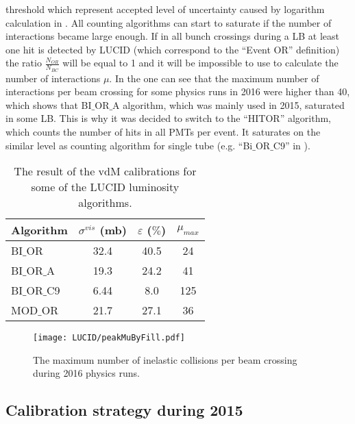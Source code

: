 threshold which represent accepted level of uncertainty caused by logarithm calculation in .
All counting algorithms can start to saturate if the number of interactions became large enough.
If in all bunch crossings during a LB at least one hit is detected by LUCID (which correspond to the ``Event OR'' definition) 
the ratio $\frac{N_{OR}}{N_{BC}}$ will be equal to 1 and it will be impossible to use  to calculate 
the number of interactions $\mu$. In the  one can see that the maximum number of interactions per beam crossing 
for some physics runs in 2016 were higher than 40, which shows that BI$\_$OR$\_$A algorithm, which was mainly used in 2015, saturated in some LB.
This is why it was decided to switch to the ``HITOR'' algorithm, which counts the number of hits in all PMTs per event.
It saturates on the similar level as counting algorithm for single tube (e.g. ``Bi$\_$OR$\_$C9'' in ).

\begin{table}[p]
  \begin{tabular}{|l|c|c|c|}
    Algorithm & $\sigma^{vis}$ (mb) & $\varepsilon$ ($\%$) & $\mu_{max}$ \\
    \hline
    BI$\_$OR & 32.4 & 40.5 & 24 \\
    \hline
    BI$\_$OR$\_$A & 19.3 & 24.2 & 41 \\
    \hline
    BI$\_$OR$\_$C9 & 6.44 & 8.0 & 125 \\
    \hline
    MOD$\_$OR & 21.7 & 27.1 & 36 \\
  \end{tabular}
  \caption{The result of the vdM calibrations for some of the LUCID luminosity algorithms.}
  \label{tab:sigma_vis_efficiency}
\end{table}

\begin{figure}
\centering
\texttt{[image: LUCID/peakMuByFill.pdf]}
\caption{The maximum number of inelastic collisions per beam crossing during 2016 physics runs.}
\label{fig:peakMuByFill}
\end{figure}

\subsection{Calibration strategy during 2015}
\label{subsec:calibPerformance}


